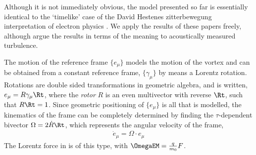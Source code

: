 Although it is not immediately obvious,
the model presented so far is essentially identical to the `timelike' case of the David Hestenes zitterbewegung interpretation of 
electron physics 
\cite{Hestenes1973, Hestenes1990,  HestenesResearchProgram}. 
We apply the results of these papers freely, 
although argue the results in terms of the meaning to acoustically measured turbulence. 


The motion of the reference frame $\{e_\mu\}$ models the motion of the vortex
and can be obtained from a constant reference frame, $\{\gamma_\mu\}$ by means a Lorentz rotation.
Rotations are double sided transformations in geometric algebra, 
and is written,
$e_\mu = R \gamma_\mu \Rt$,
where the {\em rotor} $R$ is an even multivector with reverse $\Rt$, such that $ R\Rt = 1$.
Since geometric positioning of $\{e_\mu\}$ is all that is modelled,
the kinematics of the frame can be completely determined by finding the
$\tau$-dependent bivector $\Omega =  2\dot{R}\Rt $, which represents the angular
velocity of the frame,
\begin{align}
  \dot e_\mu = \Omega \cdot e_\mu
\end{align}
The Lorentz force in  is of this type, with $\OmegaEM = \frac{q}{m_0}F$.

